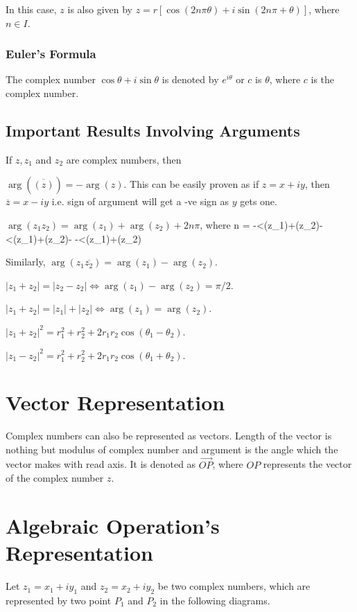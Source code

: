 In this case, $z$ is also given by $z = r[\cos(2n\pi  \theta) + i\sin(2n\pi + \theta)]$, where $n\in I$.

\subsubsection{Euler's Formula}
The complex number $\cos\theta + i\sin\theta$ is denoted by $e^{i\theta}$ or $c$ is $\theta$, where $c$ is the complex number.

\subsection{Important Results Involving Arguments}
If $z, z_1$ and $z_2$ are complex numbers, then

\startitemize[n]
\item $\arg(\overline{(z)}) = -\arg(z)$. This can be easily proven as if $z = x + iy$, then $\overline{z} = x - iy$ i.e. sign of
  argument will get a -ve sign as $y$ gets one.
\item $\arg(z_1z_2) = \arg(z_1)  + \arg(z_2) + 2n\pi$, where
  \startformula n = \startmathcases
     \NC -\pi<\arg(z_1)+\arg(z_2)\leq-\pi\NR
     \pi<\arg(z_1)+\arg(z_2)\leq-\pi\NR
     \NC -\pi<\arg(z_1)+\arg(z_2)\pi\NR\stopmathcases\stopformula
 \item Similarly, $\arg(z_1\overline{z_2}) = \arg(z_1) - \arg(z_2)$.
 \item $|z_1 + z_2| = |z_2 - z_2| \Leftrightarrow \arg(z_1) - \arg(z_2) = \pi/2$.
 \item $|z_1 + z_2| = |z_1| + |z_2| \Leftrightarrow \arg(z_1) = \arg(z_2)$.
 \item $|z_1 + z_2|^2 = r_1^2 + r_2^2 + 2r_1r_2\cos(\theta_1 - \theta_2)$.
 \item $|z_1 - z_2|^2 = r_1^2 +r_2^2 + 2r_1r_2\cos(\theta_1 + \theta_2)$.
\stopitemize

\section{Vector Representation}
Complex numbers can also be represented as vectors. Length of the vector is nothing but modulus of complex number and argument is
the angle which the vector makes with read axis. It is denoted as $\overrightarrow{OP}$, where $OP$ represents the vector of the
complex number $z$.

\section{Algebraic Operation's Representation}
Let $z_1 = x_1 + iy_1$ and $z_2 = x_2 + iy_2$ be two complex numbers, which are represented by two point $P_1$ and $P_2$ in the
following diagrams.

